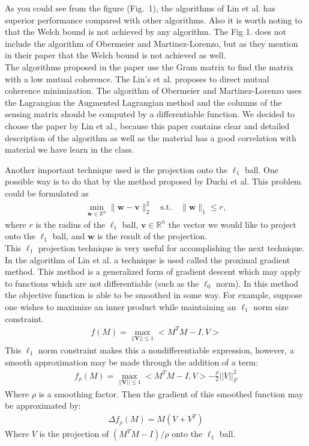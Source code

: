 \documentclass[journal]{IEEEtran}
\begin{document}
As you could see from the figure (Fig.~1), the algorithms of Lin et al. has superior performance compared with other algorithms. Also it is worth noting to that the Welch bound is not achieved by any algorithm.  The Fig 1. does not include the algorithm of Obermeier and Martinez-Lorenzo, but as they mention in their paper that the Welch bound is not achieved as well. \\
The algorithms proposed in the paper use the Gram matrix to find the matrix with a low mutual coherence. The Lin's et al. proposes to direct mutual coherence minimization. The algorithm of Obermeier and Martinez-Lorenzo uses the Lagrangian the Augmented Lagrangian method and the columns of the sensing matrix should be computed by a differentiable function. We decided to choose the paper by Lin et al., because this paper contains clear and detailed description of the algorithm as well as the material has a good correlation with material we have learn in the class. 

Another important technique used is the projection onto the $\ell_1$ ball. One possible way is to do that by the method proposed by  Duchi et al. This problem could be formulated as
\begin{align}
   \min\limits_{\mathbf{w}\in\mathbb{R}^n} \|\mathbf{w}-\mathbf{v} \|^2_2 \quad \mathrm{s.t.} \quad \|\mathbf{w} \|_1 \leq r, 
\end{align}
where $r$ is the radius of the $\ell_1$ ball, $\mathbf{v}\in\mathbb{R}^n$ the vector we would like to project onto the $\ell_1$ ball, and $\mathbf{w}$ is the result of the projection.  \\
This $\ell_1$ projection technique is very useful for accomplishing the next technique.
In the algorithm of Lin et al. a technique is used called the proximal gradient method. This method is
a generalized form of gradient descent which may apply to functions which are not differentiable 
(such as the $\ell_0$ norm). In this method the objective function is able to be smoothed in some way. 
For example, suppose one wishes to maximize an inner product while maintaining an $\ell_1$ norm size 
constraint.
\begin{align}
f(M) = \max_{||\mathbf{V}|| \leq 1} <M^T M - I, V>
\end{align}
This $\ell_1$ norm constraint makes this a nondifferentiable expression, however, a smooth approximation
may be made through the addition of a term:
\begin{align}
    f_\rho(M) = \max_{||\mathbf{V}|| \leq 1} <M^T M - I, V> - \frac{\rho}{2}||V||_F^2
\end{align}
Where $\rho$ is a smoothing factor. Then the gradient of this smoothed function may be approximated by:
\begin{align}
    \Delta f_\rho(M) = M(V + V^T)
\end{align}
Where $V$ is the projection of $(M^T M - I)/\rho$ onto the $\ell_1$ ball.
\end{document}
